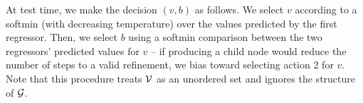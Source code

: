 At test time, we make the decision $(v, b)$ as follows. We select $v$ according to a softmin (with decreasing temperature) over the values
predicted by the first regressor. Then, we select $b$ using a softmin comparison between the two regressors'
predicted values for $v$ -- if producing a child node would reduce the number of steps to a valid refinement,
we bias toward selecting action 2 for $v$. Note that this procedure treats $\mathcal{V}$ as an unordered set and ignores
the structure of $\mathcal{G}$.